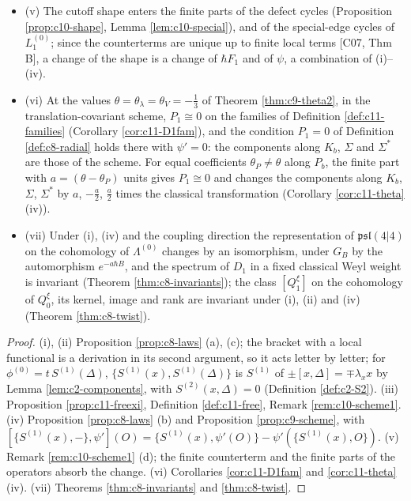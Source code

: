 \begin{proposition}
\begin{itemize}
\item (v) The cutoff shape enters the finite parts of the defect cycles (Proposition \ref{prop:c10-shape}, Lemma \ref{lem:c10-special}), and of the special-edge cycles of $L_1^{(0)}$; since the counterterms are unique up to finite local terms [C07, Thm B], a change of the shape is a change of $\hbar F_1$ and of $\psi$, a combination of (i)--(iv).
\item (vi) At the values $\theta=\theta_\lambda=\theta_V=-\tfrac13$ of Theorem \ref{thm:c9-theta2}, in the translation-covariant scheme, $P_1\cong0$ on the families of Definition \ref{def:c11-families} (Corollary \ref{cor:c11-D1fam}), and the condition $P_1=0$ of Definition \ref{def:c8-radial} holds there with $\psi'=0$: the components along $K_b$, $\Sigma$ and $\Sigma^*$ are those of the scheme. For equal coefficients $\theta_P\ne\theta$ along $P_b$, the finite part with $a=(\theta-\theta_P)$ units gives $P_1\cong0$ and changes the components along $K_b$, $\Sigma$, $\Sigma^*$ by $a$, $-\tfrac a2$, $\tfrac a2$ times the classical transformation (Corollary \ref{cor:c11-theta} (iv)).
\item (vii) Under (i), (iv) and the coupling direction the representation of $\mathfrak{psl}(4|4)$ on the cohomology of $\Lambda^{(0)}$ changes by an isomorphism, under $G_B$ by the automorphism $e^{-a\hbar B}$, and the spectrum of $D_1$ in a fixed classical Weyl weight is invariant (Theorem \ref{thm:c8-invariants}); the class $[Q^\xi_1]$ on the cohomology of $Q^\xi_0$, its kernel, image and rank are invariant under (i), (ii) and (iv) (Theorem \ref{thm:c8-twist}).
\end{itemize}
\end{proposition}

\begin{proof}
(i), (ii) Proposition \ref{prop:c8-laws} (a), (c); the bracket with a local functional is a derivation in its second argument, so it acts letter by letter; for $\phi^{(0)}=t\,S^{(1)}(\Delta)$, $\{S^{(1)}(x),S^{(1)}(\Delta)\}$ is $S^{(1)}$ of $\pm[x,\Delta]=\mp\lambda_xx$ by Lemma \ref{lem:c2-components}, with $S^{(2)}(x,\Delta)=0$ (Definition \ref{def:c2-S2}). (iii) Proposition \ref{prop:c11-freexi}, Definition \ref{def:c11-free}, Remark \ref{rem:c10-scheme1}. (iv) Proposition \ref{prop:c8-laws} (b) and Proposition \ref{prop:c9-scheme}, with $[\{S^{(1)}(x),-\},\psi'](O)=\{S^{(1)}(x),\psi'(O)\}-\psi'(\{S^{(1)}(x),O\})$. (v) Remark \ref{rem:c10-scheme1} (d); the finite counterterm and the finite parts of the operators absorb the change. (vi) Corollaries \ref{cor:c11-D1fam} and \ref{cor:c11-theta} (iv). (vii) Theorems \ref{thm:c8-invariants} and \ref{thm:c8-twist}.
\end{proof}

